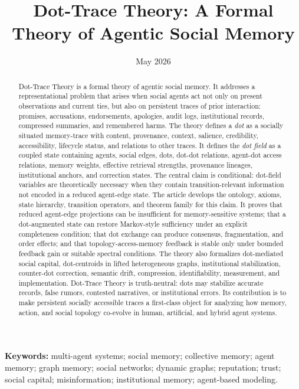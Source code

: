 \documentclass[11pt]{article}
\title{Dot-Trace Theory: A Formal Theory of Agentic Social Memory}
\author{}
\date{May 2026}
\theoremstyle{remark}
\begin{document}
\maketitle

\begin{abstract}
Dot-Trace Theory is a formal theory of agentic social memory. It addresses a representational problem that arises when social agents act not only on present observations and current ties, but also on persistent traces of prior interaction: promises, accusations, endorsements, apologies, audit logs, institutional records, compressed summaries, and remembered harms. The theory defines a \emph{dot} as a socially situated memory-trace with content, provenance, context, salience, credibility, accessibility, lifecycle status, and relations to other traces. It defines the \emph{dot field} as a coupled state containing agents, social edges, dots, dot-dot relations, agent-dot access relations, memory weights, effective retrieval strengths, provenance lineages, institutional anchors, and correction states. The central claim is conditional: dot-field variables are theoretically necessary when they contain transition-relevant information not encoded in a reduced agent-edge state. The article develops the ontology, axioms, state hierarchy, transition operators, and theorem family for this claim. It proves that reduced agent-edge projections can be insufficient for memory-sensitive systems; that a dot-augmented state can restore Markov-style sufficiency under an explicit completeness condition; that dot exchange can produce consensus, fragmentation, and order effects; and that topology-access-memory feedback is stable only under bounded feedback gain or suitable spectral conditions. The theory also formalizes dot-mediated social capital, dot-centroids in lifted heterogeneous graphs, institutional stabilization, counter-dot correction, semantic drift, compression, identifiability, measurement, and implementation. Dot-Trace Theory is truth-neutral: dots may stabilize accurate records, false rumors, contested narratives, or institutional errors. Its contribution is to make persistent socially accessible traces a first-class object for analyzing how memory, action, and social topology co-evolve in human, artificial, and hybrid agent systems.
\end{abstract}

\textbf{Keywords:} multi-agent systems; social memory; collective memory; agent memory; graph memory; social networks; dynamic graphs; reputation; trust; social capital; misinformation; institutional memory; agent-based modeling.
\end{document}
